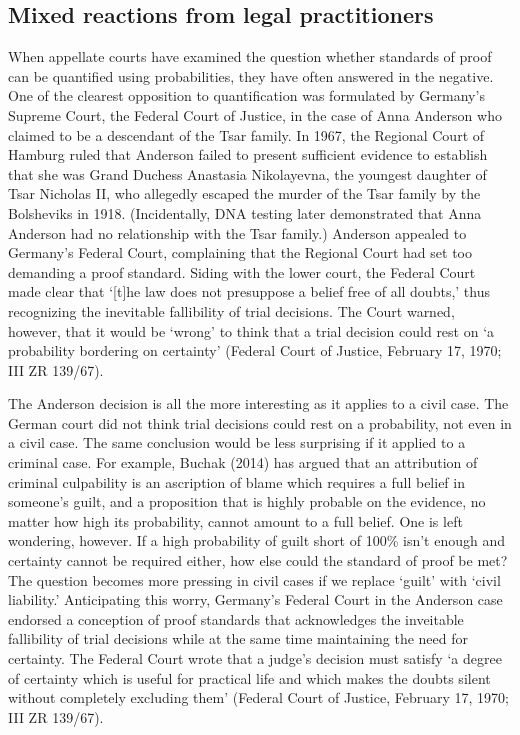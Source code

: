 \documentclass[
  10pt,
  dvipsnames,enabledeprecatedfontcommands]{scrartcl}
\begin{document}
\hypertarget{mixed-reactions-from-legal-practitioners}{%
\subsection{Mixed reactions from legal
practitioners}\label{mixed-reactions-from-legal-practitioners}}

When appellate courts have examined the question whether standards of
proof can be quantified using probabilities, they have often answered in
the negative. One of the clearest opposition to quantification was
formulated by Germany's Supreme Court, the Federal Court of Justice, in
the case of Anna Anderson who claimed to be a descendant of the Tsar
family. In 1967, the Regional Court of Hamburg ruled that Anderson
failed to present sufficient evidence to establish that she was Grand
Duchess Anastasia Nikolayevna, the youngest daughter of Tsar Nicholas
II, who allegedly escaped the murder of the Tsar family by the
Bolsheviks in 1918. (Incidentally, DNA testing later demonstrated that
Anna Anderson had no relationship with the Tsar family.) Anderson
appealed to Germany's Federal Court, complaining that the Regional Court
had set too demanding a proof standard. Siding with the lower court, the
Federal Court made clear that `{[}t{]}he law does not presuppose a
belief free of all doubts,' thus recognizing the inevitable fallibility
of trial decisions. The Court warned, however, that it would be `wrong'
to think that a trial decision could rest on `a probability bordering on
certainty' (Federal Court of Justice, February 17, 1970; III ZR 139/67).

The Anderson decision is all the more interesting as it applies to a
civil case. The German court did not think trial decisions could rest on
a probability, not even in a civil case. The same conclusion would be
less surprising if it applied to a criminal case. For example, Buchak
(2014) has argued that an attribution of criminal culpability is an
ascription of blame which requires a full belief in someone's guilt, and
a proposition that is highly probable on the evidence, no matter how
high its probability, cannot amount to a full belief. One is left
wondering, however. If a high probability of guilt short of 100\% isn't
enough and certainty cannot be required either, how else could the
standard of proof be met? The question becomes more pressing in civil
cases if we replace `guilt' with `civil liability.' Anticipating this
worry, Germany's Federal Court in the Anderson case endorsed a
conception of proof standards that acknowledges the inveitable
fallibility of trial decisions while at the same time maintaining the
need for certainty. The Federal Court wrote that a judge's decision must
satisfy `a degree of certainty which is useful for practical life and
which makes the doubts silent without completely excluding them'
(Federal Court of Justice, February 17, 1970; III ZR 139/67).
\end{document}
